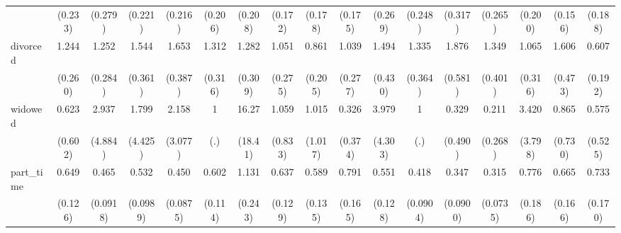 {\begin{tabular}{l*{16}{c}}
                    &     (0.233)         &     (0.279)         &     (0.221)         &     (0.216)         &     (0.206)         &     (0.208)         &     (0.172)         &     (0.178)         &     (0.175)         &     (0.269)         &     (0.248)         &     (0.317)         &     (0.265)         &     (0.200)         &     (0.156)         &     (0.188)         \\
[1em]
divorced            &       1.244         &       1.252         &       1.544         &       1.653\sym{*}  &       1.312         &       1.282         &       1.051         &       0.861         &       1.039         &       1.494         &       1.335         &       1.876\sym{*}  &       1.349         &       1.065         &       1.606         &       0.607         \\
                    &     (0.260)         &     (0.284)         &     (0.361)         &     (0.387)         &     (0.316)         &     (0.309)         &     (0.275)         &     (0.205)         &     (0.277)         &     (0.430)         &     (0.364)         &     (0.581)         &     (0.401)         &     (0.316)         &     (0.473)         &     (0.192)         \\
[1em]
widowed             &       0.623         &       2.937         &       1.799         &       2.158         &           1         &       16.27\sym{*}  &       1.059         &       1.015         &       0.326         &       3.979         &           1         &       0.329         &       0.211         &       3.420         &       0.865         &       0.575         \\
                    &     (0.602)         &     (4.884)         &     (4.425)         &     (3.077)         &         (.)         &     (18.41)         &     (0.833)         &     (1.017)         &     (0.374)         &     (4.303)         &         (.)         &     (0.490)         &     (0.268)         &     (3.798)         &     (0.730)         &     (0.525)         \\
[1em]
part\_time           &       0.649\sym{*}  &       0.465\sym{***}&       0.532\sym{***}&       0.450\sym{***}&       0.602\sym{**} &       1.131         &       0.637\sym{*}  &       0.589\sym{*}  &       0.791         &       0.551\sym{*}  &       0.418\sym{***}&       0.347\sym{***}&       0.315\sym{***}&       0.776         &       0.665         &       0.733         \\
                    &     (0.126)         &    (0.0918)         &    (0.0989)         &    (0.0875)         &     (0.114)         &     (0.243)         &     (0.129)         &     (0.135)         &     (0.165)         &     (0.128)         &    (0.0904)         &    (0.0900)         &    (0.0735)         &     (0.186)         &     (0.166)         &     (0.170)         \\

\end{tabular}}
